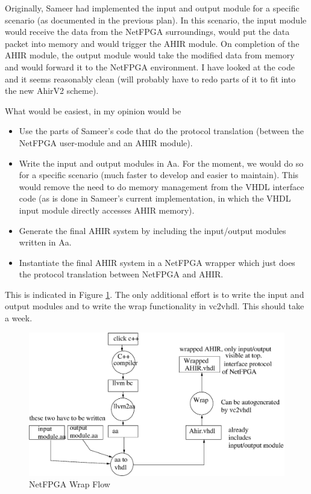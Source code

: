 \documentclass{article}
\begin{document}
Originally, Sameer had implemented the input and output module for
a specific scenario (as documented in the previous plan).  In this
scenario, the input module would receive the data from the NetFPGA
surroundings, would put the data packet into memory and would trigger
the AHIR module.  On completion of the AHIR module, the output module
would take the modified data from memory and would forward it to
the NetFPGA environment.   I have looked at the code and it
seems reasonably clean (will probably have to redo parts of it
to fit into the new AhirV2 scheme). 

What would be easiest, in my opinion would be
\begin{itemize}
\item Use the parts of Sameer's code that do the protocol
translation (between the NetFPGA user-module and an AHIR module).
\item Write the input and output modules in Aa.  For the moment,
we would do so for a specific scenario (much faster to develop and
easier to maintain).  This would remove the need to do memory 
management from the VHDL interface code (as is done in Sameer's
current implementation, in which the VHDL input module directly
accesses AHIR memory).
\item Generate the final AHIR system by including the input/output modules
written in Aa.
\item Instantiate the final AHIR system in a NetFPGA wrapper which 
just does the protocol translation between NetFPGA and AHIR.
\end{itemize}
This is indicated in Figure \ref{fig:Wrap}.   The only
additional effort is to write the input and output modules
and to write the wrap functionality in vc2vhdl.  This should
take a week.

\begin{figure}[!t]
  \centering
  \includegraphics[scale=0.7]{NetFPGAWrap.eps}
  \caption{NetFPGA Wrap Flow}
  \label{fig:Wrap}
\end{figure}
\end{document}
